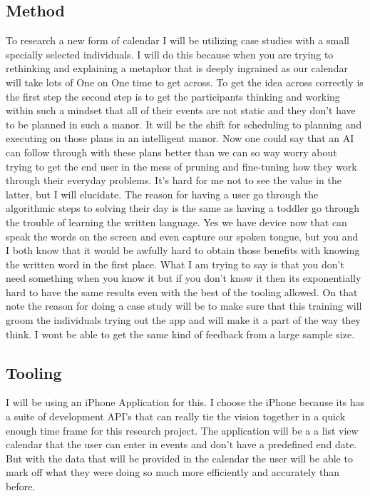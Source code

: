 \subsection{Method}
To research a new form of calendar I will be utilizing case studies with a small specially selected individuals.
I will do this because when you are trying to rethinking and explaining a metaphor that is deeply ingrained as our calendar will take lots of One on One time to get across.
To get the idea across correctly is the first step the second step is to get the participants thinking and working within such a mindset that all of their events are not static and they don't have to be planned in such a manor.
It will be the shift for scheduling to planning and executing on those plans in an intelligent manor. Now one could say that an AI can follow through with these plans better than we can so way worry about trying to get the end user in the mess of pruning and fine-tuning how they work through their everyday problems.
It's hard for me not to see the value in the latter, but I will elucidate.
The reason for having a user go through the algorithmic steps to solving their day is the same as having a toddler go through the trouble of learning the written language.
Yes we have device now that can speak the words on the screen and even capture our spoken tongue, but you and I both know that it would be awfully hard to obtain those benefits with knowing the written word in the first place.
What I am trying to say is that you don't need something when you know it but if you don't know it then its exponentially hard to have the same results even with the best of the tooling allowed.
On that note the reason for doing a case study will be to make sure that this training will groom the individuals trying out the app and will make it a part of the way they think.
I wont be able to get the same kind of feedback from a large sample size.

\subsection{Tooling}
I will be using an iPhone Application for this. I choose the iPhone because its has a suite of development API's that can really tie the vision together in a quick enough time frame for this research project. The application will be a a list view calendar that the user can enter in events and don't have a predefined end date. But with the data that will be provided in the calendar the user will be able to mark off what they were doing so much more efficiently and accurately than before.

